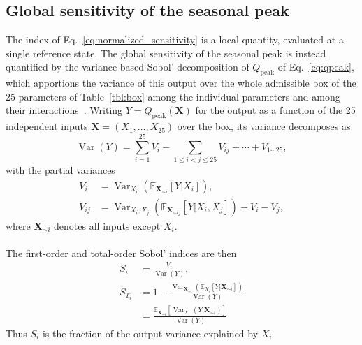 \documentclass[a4paper,fleqn]{cas-dc}
\begin{document}
\subsection{Global sensitivity of the seasonal peak}
\label{sec:results_sobol}

The index of Eq.~\eqref{eq:normalized_sensitivity} is a local quantity,
evaluated at a single reference state. The global sensitivity of the seasonal
peak is instead quantified by the variance-based Sobol' decomposition of
$Q_{\mathrm{peak}}$ of Eq.~\eqref{eq:qpeak}, which apportions the variance of
this output over the whole admissible box of the 25 parameters of
Table~\ref{tbl:box} among the individual parameters and
among their interactions~\cite{saltelli2010}. Writing $Y =
Q_{\mathrm{peak}}(\mathbf{X})$ for the output as a function of the 25
independent inputs $\mathbf{X} = (X_1,\dots,X_{25})$ over the box, its
variance decomposes as
\begin{equation}
\operatorname{Var}(Y) = \sum_{i=1}^{25} V_i
+ \sum_{1 \leq i < j \leq 25} V_{ij} + \cdots + V_{1\cdots 25},
\label{eq:sobol_decomposition}
\end{equation}
with the partial variances
\begin{equation}
\label{eq:sobol_partial}
\begin{aligned}
V_i &= \operatorname{Var}_{X_i}\left(\mathbb{E}_{\mathbf{X}_{\sim i}}
[Y | X_i]\right),
\\
V_{ij} &= \operatorname{Var}_{X_i,X_j}\left(\mathbb{E}_{\mathbf{X}_{\sim ij}}
[Y | X_i,X_j]\right) - V_i - V_j,
\end{aligned}
\end{equation}
where $\mathbf{X}_{\sim i}$ denotes all inputs except $X_i$. 
\\\\
The first-order and total-order Sobol' indices are then
\begin{equation}
\label{eq:sobol_indices}
\begin{aligned}
S_i &= \frac{V_i}{\operatorname{Var}(Y)},
\\
S_{T_i} &= 1 - \frac{\operatorname{Var}_{\mathbf{X}_{\sim i}}\left(
\mathbb{E}_{X_i}[Y | \mathbf{X}_{\sim i}]\right)}{\operatorname{Var}(Y)}\\
&= \frac{\mathbb{E}_{\mathbf{X}_{\sim i}}\left[
\operatorname{Var}_{X_i}(Y | \mathbf{X}_{\sim i})\right]}{\operatorname{Var}(Y)}
\end{aligned}
\end{equation}
Thus $S_i$ is the fraction of the output variance explained by $X_i$
\end{document}
